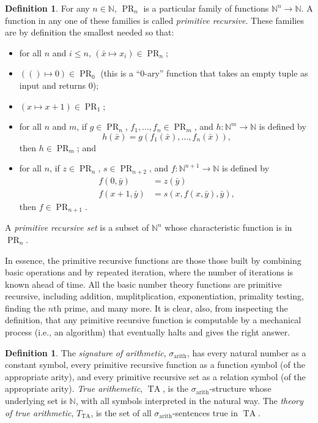 \documentclass{article}
\theoremstyle{plain}
\theoremstyle{definition}
\newtheorem{defn}[thm]{Definition}
\newcommand{\defterm}{\emph}
\newcommand{\arithsig}{\sigma_{\operatorname{arith}}}
\newcommand{\tuple}{\bar}
\DeclareMathOperator{\PR}{PR}
\DeclareMathOperator{\TA}{TA}
\newcommand{\tathy}{T_{\TA}}
\begin{document}
\begin{defn}
  For any $n \in \mathbb{N}$, $\PR_n$ is a particular family of
  functions $\mathbb{N}^n \to \mathbb{N}$. A function in any one of
  these families is called \defterm{primitive recursive}. These
  families are by definition the smallest needed so that:
  \begin{itemize}
  \item for all $n$ and $i \leq n$, $\left(\tuple{x} \mapsto x_i\right) \in \PR_n$;
  \item $\left(() \mapsto 0\right) \in \PR_0$ (this is a ``0-ary''
    function that takes an empty tuple as input and returns 0);
  \item $\left(x \mapsto x + 1\right) \in \PR_1$;
  \item for all $n$ and $m$, if $g \in \PR_n$, $f_1,\ldots,f_n \in
    \PR_m$, and $h : \mathbb{N}^m \to \mathbb{N}$ is defined
    by $$h(\tuple{x}) =
    g(f_1(\tuple{x}),\ldots,f_n(\tuple{x}))\text{,}$$ then $h \in
    \PR_m$; and
  \item for all $n$, if $z \in \PR_n$, $s \in \PR_{n+2}$, and $f :
    \mathbb{N}^{n+1} \to \mathbb{N}$ is defined by
    \begin{align*}
      f(0,\tuple{y}) &= z(\tuple{y}) \\
      f(x+1,\tuple{y}) &= s(x,f(x,\tuple{y}),\tuple{y}) \text{,}
    \end{align*}
    then $f \in \PR_{n+1}$.
  \end{itemize}

  A \defterm{primitive recursive set} is a subset of $\mathbb{N}^n$
  whose characteristic function is in $\PR_n$.
\end{defn}

In essence, the primitive recursive functions are those those built by
combining basic operations and by repeated iteration, where the number
of iterations is known ahead of time. All the basic number theory
functions are primitive recursive, including addition,
muplitplication, exponentiation, primality testing, finding the $n$th
prime, and many more. It is clear, also, from inspecting the
definition, that any primitive recursive function is computable by a
mechanical process (i.e., an algorithm) that eventually halts and
gives the right answer.

\begin{defn}
  The \defterm{signature of arithmetic}, $\arithsig$, has every
  natural number as a constant symbol, every primitive recursive
  function as a function symbol (of the appropriate arity), and every
  primitive recursive set as a relation symbol (of the appropriate
  arity). \defterm{True arithemetic}, $\TA$, is the
  $\arithsig$-structure whose underlying set is $\mathbb{N}$, with all
  symbols interpreted in the natural way. The \defterm{theory of true
    arithmetic}, $\tathy$, is the set of all $\arithsig$-sentences
  true in $\TA$.
\end{defn}
\end{document}
